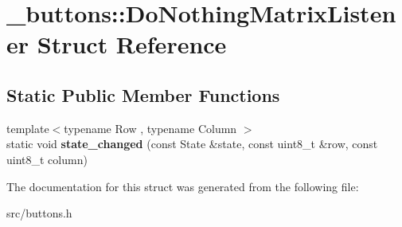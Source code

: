 \hypertarget{struct__buttons_1_1DoNothingMatrixListener}{}\section{\+\_\+buttons\+:\+:Do\+Nothing\+Matrix\+Listener Struct Reference}
\label{struct__buttons_1_1DoNothingMatrixListener}
\subsection*{Static Public Member Functions}
\begin{DoxyCompactItemize}
\item 
{\footnotesize template$<$typename Row , typename Column $>$ }\\static void {\bfseries state\+\_\+changed} (const State \&state, const uint8\+\_\+t \&row, const uint8\+\_\+t column)\hypertarget{struct__buttons_1_1DoNothingMatrixListener_a52d7045abc7a2774b0fac5f18082e936}{}\label{struct__buttons_1_1DoNothingMatrixListener_a52d7045abc7a2774b0fac5f18082e936}

\end{DoxyCompactItemize}


The documentation for this struct was generated from the following file\+:\begin{DoxyCompactItemize}
\item 
src/buttons.\+h\end{DoxyCompactItemize}
